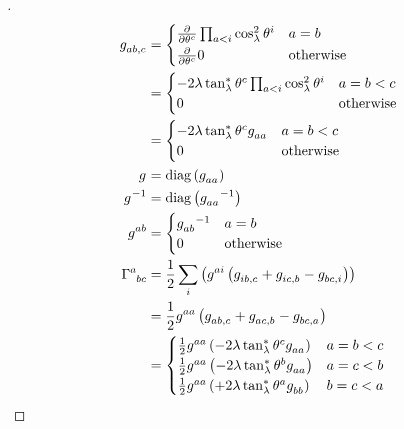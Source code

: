 \documentclass[../main.tex]{subfiles}
\begin{document}
\begin{proof}[]
\begin{align*}
\tensor{g}{_a_b_{,c}}
&=\begin{cases}
\frac{\partial}{\partial\tensor{\theta}{^c}}\prod_{a<i}{\cos_\lambda^2\tensor{\theta}{^i}}&\text{$a=b$}\\
\frac{\partial}{\partial\tensor{\theta}{^c}}0&\text{otherwise}\\
\end{cases}\\
&=\begin{cases}
-2\lambda\tan_\lambda^\ast\tensor{\theta}{^c}\prod_{a<i}{\cos_\lambda^2\tensor{\theta}{^i}}&\text{$a=b<c$}\\
0&\text{otherwise}\\
\end{cases}\\
&=\begin{cases}
-2\lambda\tan_\lambda^\ast\tensor{\theta}{^c}\tensor{g}{_a_a}&\text{$a=b<c$}\\
0&\text{otherwise}\\
\end{cases}\\
\tensor{g}{}
&=\diag\left(\tensor{g}{_a_a}\right)\\
{\tensor{g}{}}^{-1}
&=\diag\left({\tensor{g}{_a_a}}^{-1}\right)\\
\tensor{g}{^a^b}
&=\begin{cases}
{\tensor{g}{_a_b}}^{-1}&\text{$a=b$}\\
0&\text{otherwise}\\
\end{cases}\\
\tensor{\Gamma}{^a_b_c}
&=
\frac{1}{2}
\sum_{i}\left(
\tensor{g}{^a^i}
\left(
\tensor{g}{_i_b_{,c}}
+\tensor{g}{_i_c_{,b}}
-\tensor{g}{_b_c_{,i}}
\right)
\right)\\
&=
\frac{1}{2}
\tensor{g}{^a^a}
\left(
\tensor{g}{_a_b_{,c}}
+\tensor{g}{_a_c_{,b}}
-\tensor{g}{_b_c_{,a}}
\right)\\
&=\begin{cases}
\frac{1}{2}\tensor{g}{^a^a}\left(-2\lambda\tan_\lambda^\ast\tensor{\theta}{^c}\tensor{g}{_a_a}\right)&\text{$a=b<c$}\\
\frac{1}{2}\tensor{g}{^a^a}\left(-2\lambda\tan_\lambda^\ast\tensor{\theta}{^b}\tensor{g}{_a_a}\right)&\text{$a=c<b$}\\
\frac{1}{2}\tensor{g}{^a^a}\left(+2\lambda\tan_\lambda^\ast\tensor{\theta}{^a}\tensor{g}{_b_b}\right)&\text{$b=c<a$}\\

\end{cases}
\end{align*}
\end{proof}
\end{document}
